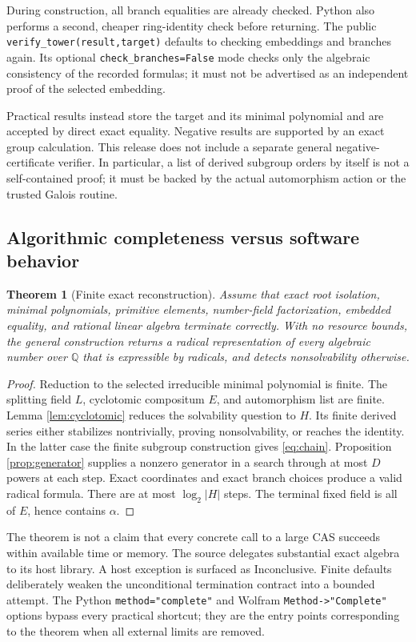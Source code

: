 \documentclass[11pt,letterpaper]{article}
\newtheorem{theorem}{Theorem}[section]
\theoremstyle{definition}\newtheorem{definition}[theorem]{Definition}
\theoremstyle{remark}\newtheorem{remark}[theorem]{Remark}
\newcommand{\Q}{\mathbb Q}
\newcommand{\code}[1]{\texttt{#1}}
\newcommand{\status}[1]{\textsf{#1}}
\begin{document}
During construction, all branch equalities are already checked. Python
also performs a second, cheaper ring-identity check before returning. The
public \code{verify\_tower(result,target)} defaults to checking embeddings
and branches again. Its optional \code{check\_branches=False} mode checks
only the algebraic consistency of the recorded formulas; it must not be
advertised as an independent proof of the selected embedding.

Practical results instead store the target and its minimal polynomial and
are accepted by direct exact equality. Negative results are supported by an
exact group calculation. This release does not include a separate general
negative-certificate verifier. In particular, a list of derived subgroup
orders by itself is not a self-contained proof; it must be backed by the
actual automorphism action or the trusted Galois routine.

\subsection{Algorithmic completeness versus software behavior}
\begin{theorem}[Finite exact reconstruction]\label{thm:complete}
Assume that exact root isolation, minimal polynomials, primitive elements,
number-field factorization, embedded equality, and rational linear algebra
terminate correctly. With no resource bounds, the general construction
returns a radical representation of every algebraic number over $\Q$ that
is expressible by radicals, and detects nonsolvability otherwise.
\end{theorem}
\begin{proof}
Reduction to the selected irreducible minimal polynomial is finite.
The splitting field $L$, cyclotomic compositum $E$, and automorphism list
are finite. Lemma \ref{lem:cyclotomic} reduces the solvability question to
$H$. Its finite derived series either stabilizes nontrivially, proving
nonsolvability, or reaches the identity. In the latter case the finite
subgroup construction gives \eqref{eq:chain}. Proposition
\ref{prop:generator} supplies a nonzero generator in a search through at
most $D$ powers at each step. Exact coordinates and exact branch choices
produce a valid radical formula. There are at most $\log_2|H|$ steps.
The terminal fixed field is all of $E$, hence contains $\alpha$.
\end{proof}

The theorem is not a claim that every concrete call to a large CAS succeeds
within available time or memory. The source delegates substantial exact
algebra to its host library. A host exception is surfaced as
\status{Inconclusive}. Finite defaults deliberately weaken the unconditional
termination contract into a bounded attempt. The Python
\code{method="complete"} and Wolfram \code{Method->"Complete"} options
bypass every practical shortcut; they are the entry points corresponding
to the theorem when all external limits are removed.
\end{document}
